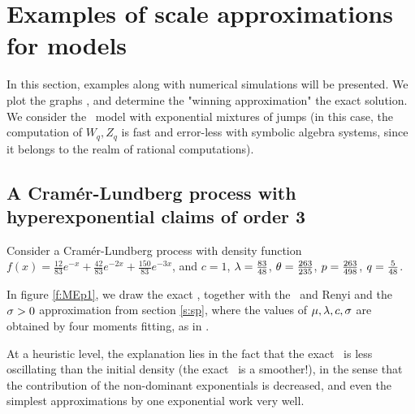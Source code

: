 
\section{Examples of scale approximations for \CL models }

In this section, examples along with numerical simulations will be presented. We plot the graphs , and determine the "winning approximation" \wrt the exact solution. We consider the \CL\ model with exponential mixtures of jumps (in this case, the computation of $W_q,Z_q$ is fast and error-less with symbolic algebra systems, since it belongs to the realm of rational computations).



\subsection{A Cram\'{e}r-Lundberg process with hyperexponential claims of order 3} \label{e:MixExp83}
Consider a Cram\'{e}r-Lundberg process with density function
$f(x)=\frac{12}{83 }e^{-x}+\frac{42}{83} e^{-2 x}+\frac{150}{83}e^{-3x}$, and $c=1$,  $\lambda=\frac{83}{48}$, $\theta=\frac{263}{235}$, $p= \frac{263}{498}$, $q=\frac{5}{48}$.

\iffalse
In  figure \ref{f:MEp1}, we draw the exact \rp, together with the \deV\ and
Renyi  and the $\sigma >0$  approximation from section \ref{s:sp}, where the values of $\mu,\lambda,c,\sigma$ are obtained by four moments fitting, as  in .


At a heuristic level,  the explanation lies in the fact that the exact \rp\ is  less oscillating than the initial density (the exact \rp\ is a smoother!), in the sense that the contribution of the non-dominant exponentials is decreased,
and  even the simplest
 approximations by one  exponential work very well.


